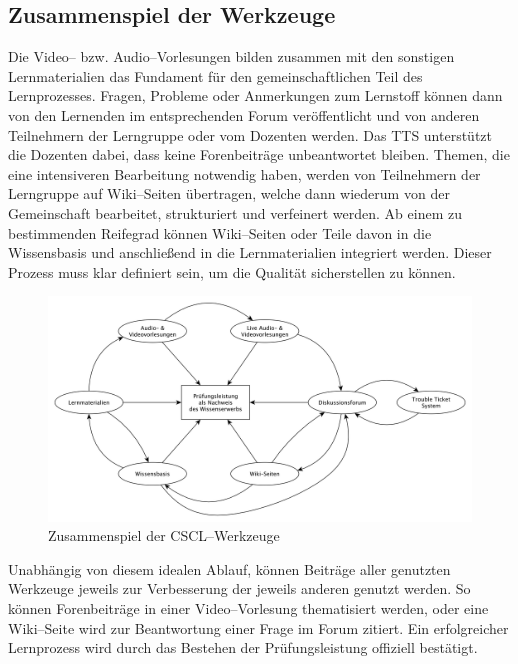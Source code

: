 \subsection{Zusammenspiel der Werkzeuge} %
\label{sub:zusammenspiel_der_werkzeuge}
Die Video– bzw. Audio–Vorlesungen bilden zusammen mit den sonstigen Lernmaterialien das Fundament für den gemeinschaftlichen Teil des Lernprozesses. Fragen, Probleme oder Anmerkungen zum Lernstoff können dann von den Lernenden im entsprechenden Forum veröffentlicht und von anderen Teilnehmern der Lerngruppe oder vom Dozenten werden. Das \ac{TTS} unterstützt die Dozenten dabei, dass keine Forenbeiträge unbeantwortet bleiben.
Themen, die eine intensiveren Bearbeitung notwendig haben, werden von Teilnehmern der Lerngruppe auf Wiki–Seiten übertragen, welche dann wiederum von der Gemeinschaft bearbeitet, strukturiert und verfeinert werden. Ab einem zu bestimmenden Reifegrad können Wiki–Seiten oder Teile davon in die Wissensbasis und anschließend in die Lernmaterialien integriert werden. Dieser Prozess muss klar definiert sein, um die Qualität sicherstellen zu können. 

\begin{figure}[H]
\begin{center}
\includegraphics[width=\textwidth]{tools.jpg}
\caption{Zusammenspiel der CSCL–Werkzeuge}
\label{fig:toos}
\end{center}
\end{figure}

Unabhängig von diesem idealen Ablauf, können Beiträge aller genutzten Werkzeuge jeweils zur Verbesserung der jeweils anderen genutzt werden. So können Forenbeiträge in einer Video–Vorlesung thematisiert werden, oder eine Wiki–Seite wird zur Beantwortung einer Frage im Forum zitiert. Ein erfolgreicher Lernprozess wird durch das Bestehen der Prüfungsleistung offiziell bestätigt.

